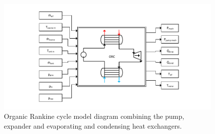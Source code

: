 \begin{figure}[h]
	\centering

	\includegraphics[width=\textwidth]{figures/ORCBlock.pdf} 

	\caption{Organic Rankine cycle model diagram combining the pump, expander and evaporating and condensing heat exchangers.}
	\label{fig:orcblock_label}

\end{figure}